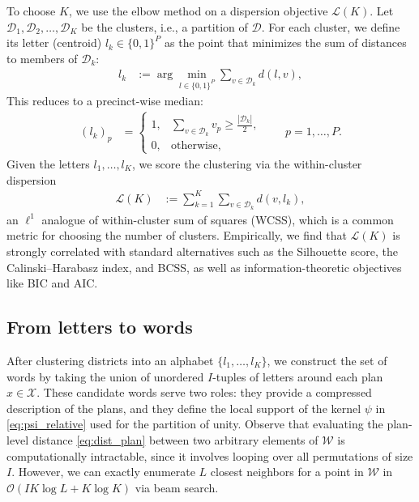 To choose $K$, we use the elbow method on a dispersion objective $\mathcal{L}(K)$.
Let $\mathcal{D}_1,\mathcal{D}_2,\dots,\mathcal{D}_K$ be the clusters, i.e., a partition of $\mathcal{D}$.
For each cluster, we define its letter (centroid) $l_k\in\{0,1\}^P$ as the point that minimizes the sum of distances to members of $\mathcal{D}_k$:
\begin{align}\label{eq:centroid definition}
    l_k &:= \arg\min_{l\in\{0,1\}^P}\sum_{v\in\mathcal{D}_k}d(l,v),
\end{align}
This reduces to a precinct-wise median:
\begin{align}
    (l_k)_p &=
    \begin{cases}
        1, & \sum_{v\in\mathcal{D}_k} v_p \ge \frac{|\mathcal{D}_k|}{2},\\
        0, & \text{otherwise,}
    \end{cases}
    \qquad p=1,\dots,P.
\end{align}
Given the letters $l_1,\dots,l_K$, we score the clustering via the within-cluster dispersion
\begin{align}\label{eq:dispersion_obj}
    \mathcal{L}(K) &:= \sum_{k=1}^K \sum_{v\in\mathcal{D}_k} d(v,l_k),
\end{align}
an $\ell^1$ analogue of within-cluster sum of squares (WCSS), which is a common metric for choosing the number of clusters.
Empirically, we find that $\mathcal{L}(K)$ is strongly correlated with standard alternatives such as the Silhouette score, the Calinski--Harabasz index, and BCSS, as well as information-theoretic objectives like BIC and AIC.

\subsection{From letters to words}\label{subsec:letters_to_words}
After clustering districts into an alphabet $\{l_1,\dots,l_K\}$, we construct the set of words by taking the union of unordered $I$-tuples of letters around each plan $x\in\mathcal{X}$.
These candidate words serve two roles: they provide a compressed description of the plans, and they define the local support of the kernel $\psi$ in \eqref{eq:psi_relative} used for the partition of unity.
Observe that evaluating the plan-level distance \eqref{eq:dist_plan} between two arbitrary elements of $\mathcal{W}$ is computationally intractable, since it involves looping over all permutations of size $I$.
However, we can exactly enumerate $L$ closest neighbors for a point in $\mathcal{W}$ in $\mathcal{O}(IK\log L+K\log K)$ via beam search.

